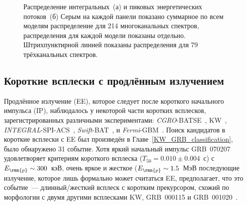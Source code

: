 \begin{figure}
    \begin{minipage}[h]{0.5\textwidth}
    \end{minipage}
    \hfill
    \begin{minipage}[h]{0.5\textwidth}
	\end{minipage}
\caption{
    Распределение интегральных~(а) и пиковых энергетических потоков~(б)
    Серым на каждой панели показано суммарное по всем моделям распределение для 214
    многоканальных спектров, распределения для каждой модели показаны отдельно. 
    Штрихпунктирной линией показаны распределения для 79 трёхканальных спектров.
    \label{fig:fl_pf_dist} }
\end{figure}
\FloatBarrier
\subsection{Короткие всплески с продлённым излучением}\label{sec:EE}
Продлённое излучение (EE), которое следует после короткого начального импульса (IP),
наблюдалось у некоторой части коротких всплесков, зарегистрированных различными экспериментами:
\textit{CGRO}-BATSE~\citep{Burenin_2000AstL, Norris_and_Bonnel_2006ApJ, Bostanci_2013MNRAS}, 
KW~\citep{Mazets_2002astroph, Frederiks_2004ASPC}, 
\textit{INTEGRAL}-SPI-ACS~\citep{Minaev_2010AstL}, 
\textit{Swift}-BAT~\citep{Norris_2011ApJ, Sakamoto_2011ApJS}, 
и \textit{Fermi}-GBM~\citep{Kaneko_2015MNRAS}. 
Поиск кандидатов в короткие всплески с EE был произведён в Главе~\ref{KW_GRB_classification}, 
было обнаружено 31 событие. Хотя яркий начальный импульс GRB~070207~\citep{Golenetskii_2007GCN6089}
удовлетворяет критериям короткого всплеска ($T_{50}=0.010\pm0.004$~с) с $E_\rmn{p}\sim 300$~кэВ,
очень яркое и жесткое ($E_\rmn{p}\sim 1.5$~МэВ последующие излучение, которое лишь формально может
считаться EE, предполагает, что это событие~--- длинный/жесткий всплеск с коротким прекурсором,
схожий по морфологии с двумя другими всплесками KW, GRB~000115 
и GRB~001020~\citep{Hurley_2000GCN859}.


